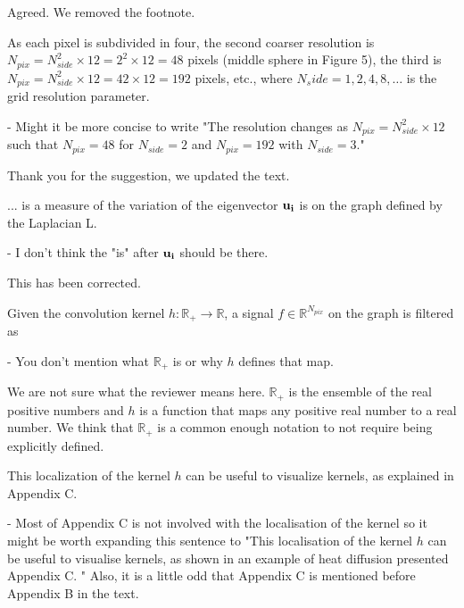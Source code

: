 \documentclass[12pt,a4paper]{article}
\newcommand{\nati}[1]{{\color[rgb]{.1,.6,.1}{NP: #1}}}
\newcommand{\mdeff}[1]{{\color[rgb]{.1,.6,.1}{MD: #1}}}
\newcommand{\1}{\b{1}}              %
\newcommand{\0}{\b{0}}              %
\begin{document}
Agreed. We removed the footnote.

\begin{mdframed}[style=comment]
As each pixel is subdivided in four, the second coarser resolution is $N_{pix} = N_{side}^2\times12=2^2\times12=48$ pixels (middle sphere in Figure 5), the third is $N_{pix} = N_{side}^2\times12=42\times12=192$ pixels, etc., where $N_side =1,2,4,8,\dots$ is the grid resolution parameter.

- Might it be more concise to write "The resolution changes as $N_{pix} = N^2_{side}\times12$ such that $N_{pix} = 48$ for $N_{side} = 2$ and $N_{pix} = 192$ with $N_{side}=3$."
\end{mdframed}

Thank you for the suggestion, we updated the text.

\begin{mdframed}[style=comment]
... is a measure of the variation of the eigenvector $\bf{u}_i$ is on the graph defined by the Laplacian L.

 - I don't think the "is" after $\bf{u}_i$ should be there.
\end{mdframed}

This has been corrected.

\begin{mdframed}[style=comment]
Given the convolution kernel $h:\mathbb{R}_+ \to \mathbb{R}$, a signal $f\in\mathbb{R}^{N_{pix}}$ on the graph is filtered as

- You don't mention what $\mathbb{R}_+$ is or why $h$ defines that map.
\end{mdframed}

We are not sure what the reviewer means here.
$\mathbb{R}_+$ is the ensemble of the real positive numbers and $h$ is a function that maps any positive real number to a real number.
We think that $\mathbb{R}_+$ is a common enough notation to not require being explicitly defined.


\begin{mdframed}[style=comment]
This localization of the kernel $h$ can be useful to visualize kernels, as explained in Appendix C.

 - Most of Appendix C is not involved with the localisation of the kernel so it might be worth expanding this sentence to "This localisation of the kernel $h$ can be useful to visualise kernels, as shown in an example of heat diffusion presented Appendix C. " Also, it is a little odd that Appendix C is mentioned before Appendix B in the text.
\end{mdframed}
\end{document}
